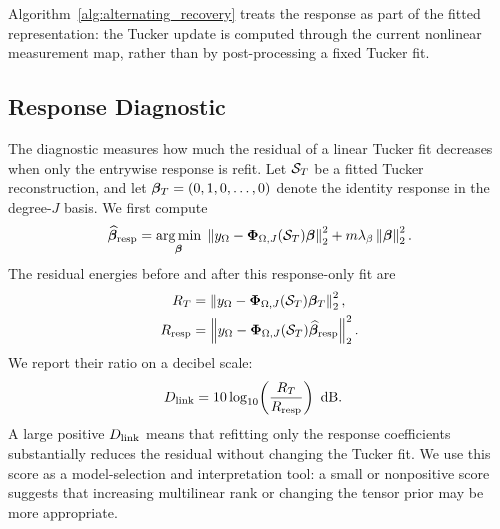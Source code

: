 Algorithm~\ref{alg:alternating_recovery} treats the response as part of the
fitted representation: the Tucker update is computed through the current
nonlinear measurement map, rather than by post-processing a fixed Tucker fit.

\subsection{Response Diagnostic}

The diagnostic measures how much the residual of a linear Tucker fit decreases
when only the entrywise response is refit. Let $\mathcal{S}_T$ be a fitted Tucker
reconstruction, and let $\boldsymbol{\beta}_T=(0,1,0,\ldots,0)$ denote the identity response
in the degree-$J$ basis. We first compute
\begin{align}
  \widehat{\boldsymbol{\beta}}_{\mathrm{resp}}
  =\operatorname*{arg\,min}_{\boldsymbol{\beta}}\;
  \left\lVert y_\Omega-\boldsymbol{\Phi}_{\Omega,J}(\mathcal{S}_T)\boldsymbol{\beta} \right\rVert_2^2
  +m\lambda_\beta\left\lVert \boldsymbol{\beta} \right\rVert_2^2.
  \label{eq:diagnostic-response-fit}
\end{align}
The residual energies before and after this response-only fit are
\begin{align}
  R_T
  &=\left\lVert y_\Omega-\boldsymbol{\Phi}_{\Omega,J}(\mathcal{S}_T)\boldsymbol{\beta}_T \right\rVert_2^2, \\
  R_{\mathrm{resp}}
  &=\left\lVert y_\Omega-\boldsymbol{\Phi}_{\Omega,J}(\mathcal{S}_T)
  \widehat{\boldsymbol{\beta}}_{\mathrm{resp}} \right\rVert_2^2.
\end{align}
We report their ratio on a decibel scale:
\begin{align}
  D_{\mathrm{link}}
  &=
  10\log_{10}\!\left(\frac{R_T}{R_{\mathrm{resp}}}\right)\ \mathrm{dB}.
  \label{eq:dlink}
\end{align}
A large positive $D_{\mathrm{link}}$ means that refitting only the response coefficients
substantially reduces the residual without changing the Tucker fit. We use this
score as a model-selection and interpretation tool: a small or nonpositive score
suggests that increasing multilinear rank or changing the tensor prior may be
more appropriate.
